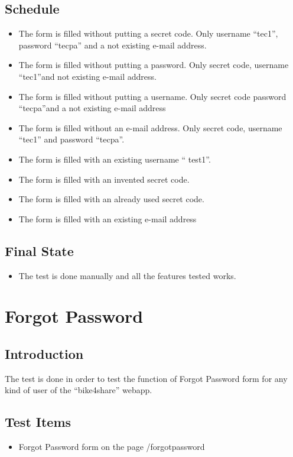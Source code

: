 \documentclass{article}
\begin{document}
\subsection{Schedule}
\begin{itemize}
    \item The form is filled without putting a secret code. Only username “tec1”, password “tecpa” and a not existing e-mail address.
    \item The form is filled without putting a password. Only secret code, username “tec1”and not existing e-mail address.
    \item The form is filled without putting a username. Only secret code password “tecpa”and a not existing e-mail address
    \item The form is filled without an e-mail address. Only secret code, username “tec1” and password “tecpa”.
    \item The form is filled with an existing username “ test1”.
    \item The form is filled with an invented secret code.
    \item The form is filled with an already used secret code.
     \item The form is filled with an existing e-mail address
\end{itemize}
\subsection{Final State}
\begin{itemize}
    \item The test is done manually and all the features tested works.
\end{itemize}

\section{Forgot Password}
\subsection{Introduction}
The test is done in order to test the function of Forgot Password form for any kind of user of the “bike4share” webapp.
\subsection{Test Items}
\begin{itemize}
    \item Forgot Password form on the page /forgotpassword
\end{itemize}
\end{document}
